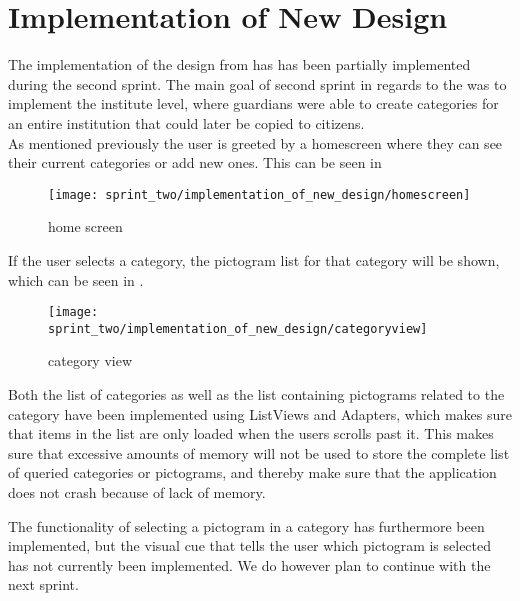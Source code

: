 \section{Implementation of New Design}
\label{sec:implementation_of_new_design}

The implementation of the design from  has has been partially implemented during the second sprint. The main goal of second sprint in regards to the \ct was to implement the institute level, where guardians were able to create categories for an entire institution that could later be copied to citizens.\\

As mentioned previously the user is greeted by a homescreen where they can see their current categories or add new ones. This can be seen in 

\begin{figure}[!htbp]
    \centering
    \texttt{[image: sprint\_two/implementation\_of\_new\_design/homescreen]}
    \caption{\ct home screen}
    \label{fig:ct_home_screen}
\end{figure}

If the user selects a category, the pictogram list for that category will be shown, which can be seen in .\\

\begin{figure}[!htbp]
    \centering
    \texttt{[image: sprint\_two/implementation\_of\_new\_design/categoryview]}
    \caption{\ct category view}
    \label{fig:ct_category_view}
\end{figure}


Both the list of categories as well as the list containing pictograms related to the category have been implemented using ListViews and Adapters, which makes sure that items in the list are only loaded when the users scrolls past it. This makes sure that excessive amounts of memory will not be used to store the complete list of queried categories or pictograms, and thereby make sure that the application does not crash because of lack of memory. 

The functionality of selecting a pictogram in a category has furthermore been implemented, but the visual cue that tells the user which pictogram is selected has not currently been implemented. We do however plan to continue with the \ct next sprint. 